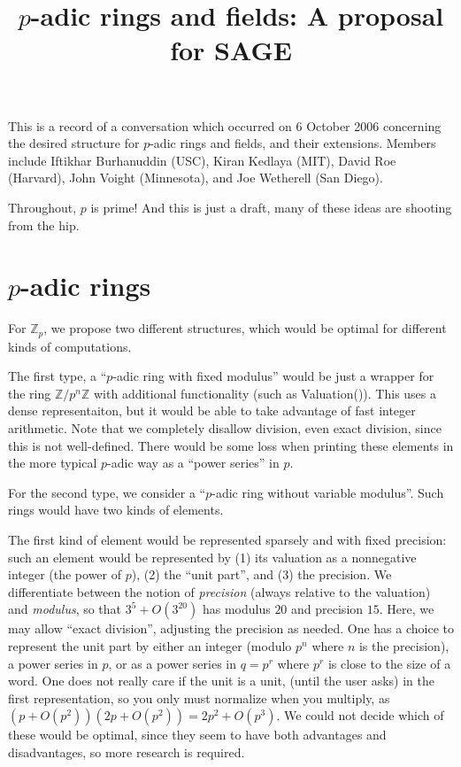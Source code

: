 \documentclass[12pt]{amsart}
\title{$p$-adic rings and fields: A proposal for \textsf{SAGE}}
\newcommand{\Z}{\mathbb Z}
\begin{document}
\maketitle

This is a record of a conversation which occurred on 6 October 2006 concerning the desired structure for $p$-adic rings and fields, and their extensions.  Members include Iftikhar Burhanuddin (USC), Kiran Kedlaya (MIT), David Roe (Harvard), John Voight (Minnesota), and Joe Wetherell (San Diego).  

Throughout, $p$ is prime!  And this is just a draft, many of these ideas are shooting from the hip.

\section{$p$-adic rings}

For $\Z_p$, we propose two different structures, which would be optimal for different kinds of computations.

The first type, a ``$p$-adic ring with fixed modulus'' would be just a wrapper for the ring $\Z/p^n \Z$ with additional functionality (such as \textsf{Valuation()}).  This uses a dense representaiton, but it would be able to take advantage of fast integer arithmetic.  Note that we completely disallow division, even exact division, since this is not well-defined.  There would be some loss when printing these elements in the more typical $p$-adic way as a ``power series'' in $p$.  

For the second type, we consider a ``$p$-adic ring without variable modulus''.  Such rings would have two kinds of elements.  

The first kind of element would be represented sparsely and with fixed precision: such an element would be represented by (1) its valuation as a nonnegative integer (the power of $p$), (2) the ``unit part'', and (3) the precision.  We differentiate between the notion of \emph{precision} (always relative to the valuation) and \emph{modulus}, so that $3^5 + O(3^20)$ has modulus $20$ and precision $15$.  Here, we may allow ``exact division'', adjusting the precision as needed.  One has a choice to represent the unit part by either an integer (modulo $p^n$ where $n$ is the precision), a power series in $p$, or as a power series in $q=p^r$ where $p^r$ is close to the size of a word.  One does not really care if the unit is a unit, (until the user asks) in the first representation, so you only must normalize when you multiply, as $(p+O(p^2))(2p+O(p^2))=2p^2+O(p^3)$.  We could not decide which of these would be optimal, since they seem to have both advantages and disadvantages, so more research is required.
\end{document}

